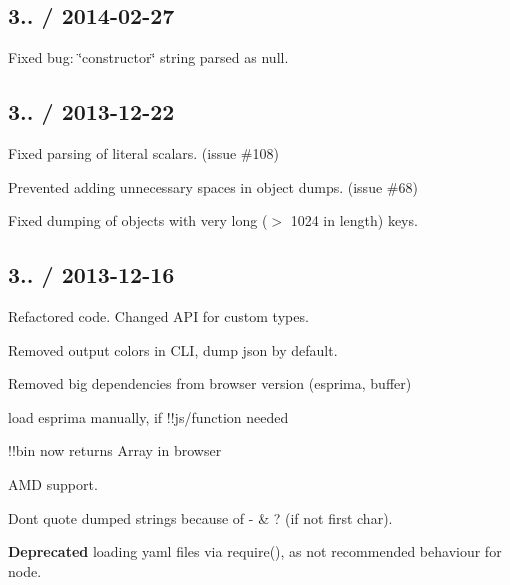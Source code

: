 \subsection*{3.. / 2014-\/02-\/27 }


\begin{DoxyItemize}
\item Fixed bug\+: \char`\"{}constructor\char`\"{} string parsed as {\ttfamily null}.
\end{DoxyItemize}

\subsection*{3.. / 2013-\/12-\/22 }


\begin{DoxyItemize}
\item Fixed parsing of literal scalars. (issue \#108)
\item Prevented adding unnecessary spaces in object dumps. (issue \#68)
\item Fixed dumping of objects with very long ($>$ 1024 in length) keys.
\end{DoxyItemize}

\subsection*{3.. / 2013-\/12-\/16 }


\begin{DoxyItemize}
\item Refactored code. Changed A\+P\+I for custom types.
\item Removed output colors in C\+L\+I, dump json by default.
\item Removed big dependencies from browser version (esprima, buffer)
\begin{DoxyItemize}
\item load {\ttfamily esprima} manually, if !!js/function needed
\item !!bin now returns Array in browser
\end{DoxyItemize}
\item A\+M\+D support.
\item Don\textquotesingle{}t quote dumped strings because of {\ttfamily -\/} \& {\ttfamily ?} (if not first char).
\item {\bfseries Deprecated} loading yaml files via {\ttfamily require()}, as not recommended behaviour for node.
\end{DoxyItemize}

